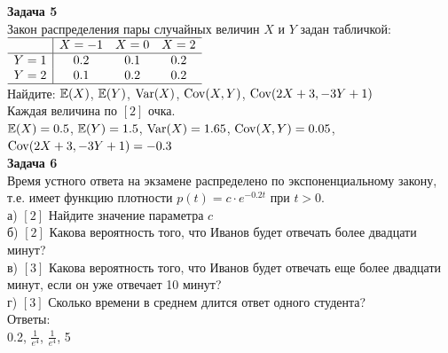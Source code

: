 \documentclass[12pt, a4paper]{article}\usepackage[]{graphicx}\usepackage[]{color}
\begin{document}


	\textbf{Задача 5} \\
	Закон распределения пары случайных величин $X$ и $Y$ задан табличкой: \\
	$\begin{array}{c|ccc}
	\hline
	& X=-1 & X=0 & X=2 \\
	\hline
	Y=1 & 0.2 & 0.1 & 0.2 \\
	Y=2 & 0.1 & 0.2 & 0.2 \\
	\hline
	\end{array}$ \\
	Найдите: $\mathbb{E}(X)$, $\mathbb{E}(Y)$, $\operatorname{Var}(X)$, $\operatorname{Cov}(X,Y)$, $\operatorname{Cov}(2X+3,-3Y+1)$ \\
	Каждая величина по $[2]$ очка. \\
	$\mathbb{E}(X)=0.5$, $\mathbb{E}(Y)=1.5$, $\operatorname{Var}(X)=1.65$, $\operatorname{Cov}(X,Y)=0.05$, $\operatorname{Cov}(2X+3,-3Y+1)=-0.3$ \\

	\textbf{Задача 6} \\ %
	Время устного ответа на экзамене распределено по экспоненциальному закону, т.е. имеет функцию плотности $p(t)=c\cdot e^{-0.2t}$ при $t>0$. \\
	а) $[2]$ Найдите значение параметра $c$ \\
	б) $[2]$ Какова вероятность того, что Иванов будет отвечать более двадцати минут? \\
	в) $[3]$ Какова вероятность того, что Иванов будет отвечать еще более двадцати минут, если он уже отвечает 10 минут? \\
	г) $[3]$ Сколько времени в среднем длится ответ одного студента? \\
	Ответы: \\
	0.2, $\frac{1}{e^4}$, $\frac{1}{e^4}$, 5 \\
\end{document}
